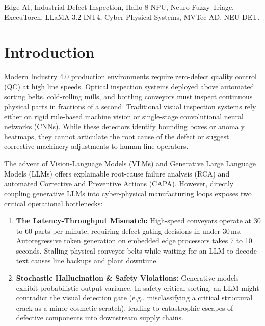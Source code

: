\documentclass[conference]{IEEEtran}
\begin{document}
\begin{IEEEkeywords}
Edge AI, Industrial Defect Inspection, Hailo-8 NPU, Neuro-Fuzzy Triage, ExecuTorch, LLaMA 3.2 INT4, Cyber-Physical Systems, MVTec AD, NEU-DET.
\end{IEEEkeywords}

\section{Introduction}
Modern Industry 4.0 production environments require zero-defect quality control (QC) at high line speeds. Optical inspection systems deployed above automated sorting belts, cold-rolling mills, and bottling conveyors must inspect continuous physical parts in fractions of a second. Traditional visual inspection systems rely either on rigid rule-based machine vision or single-stage convolutional neural networks (CNNs). While these detectors identify bounding boxes or anomaly heatmaps, they cannot articulate the root cause of the defect or suggest corrective machinery adjustments to human line operators.

The advent of Vision-Language Models (VLMs) and Generative Large Language Models (LLMs) offers explainable root-cause failure analysis (RCA) and automated Corrective and Preventive Actions (CAPA). However, directly coupling generative LLMs into cyber-physical manufacturing loops exposes two critical operational bottlenecks:
\begin{enumerate}
    \item \textbf{The Latency-Throughput Mismatch:} High-speed conveyors operate at 30 to 60 parts per minute, requiring defect gating decisions in under 30\,ms. Autoregressive token generation on embedded edge processors takes 7 to 10 seconds. Stalling physical conveyor belts while waiting for an LLM to decode text causes line backups and plant downtime.
    \item \textbf{Stochastic Hallucination \& Safety Violations:} Generative models exhibit probabilistic output variance. In safety-critical sorting, an LLM might contradict the visual detection gate (e.g., misclassifying a critical structural crack as a minor cosmetic scratch), leading to catastrophic escapes of defective components into downstream supply chains.
\end{enumerate}
\end{document}
